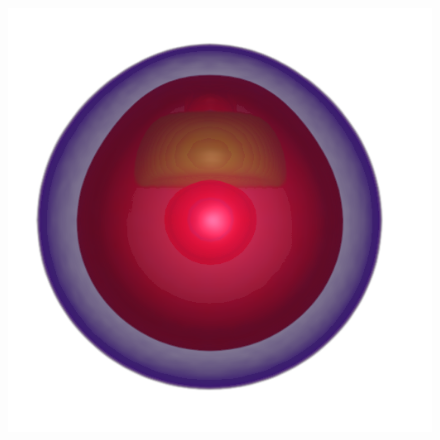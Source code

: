 \begin{figure}
\centering
\begin{minipage}{.24\textwidth}
	\includegraphics[width=1\linewidth]{figures/nucleon_naive_proportional}
	\subcaption{}
\end{minipage}~
\begin{minipage}{.15\textwidth}

\end{minipage}
\end{figure}
